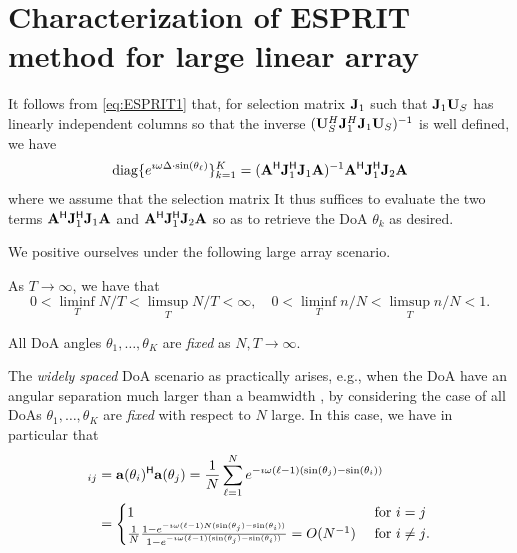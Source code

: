 \documentclass[11pt,a4paper]{article}
\begin{document}
\section{Characterization of ESPRIT method for large linear array}


It follows from \eqref{eq:ESPRIT1} that, for selection matrix ${\mathbf{J}}_1$ such that ${\mathbf{J}}_1  {\mathbf{U}}_S$ has linearly independent columns so that the inverse $( {\mathbf{U}}_S^H {\mathbf{J}}_1^H {\mathbf{J}}_1  {\mathbf{U}}_S )^{-1} $ is well defined, we have 
\begin{align*}
         \operatorname{diag}\{ e^{\imath \omega \Delta \cdot \sin(\theta_\ell)} \}_{k=1}^K = ({\mathbf{A}}^{\sf H} {\mathbf{J}}_1^{\sf H} {\mathbf{J}}_1 {\mathbf{A}})^{-1} {\mathbf{A}}^{\sf H} {\mathbf{J}}_1^{\sf H} {\mathbf{J}}_2 {\mathbf{A}} 
\end{align*}
where we assume that the selection matrix 
It thus suffices to evaluate the two terms $ {\mathbf{A}}^{\sf H} {\mathbf{J}}_1^{\sf H} {\mathbf{J}}_1 {\mathbf{A}}$ and ${\mathbf{A}}^{\sf H} {\mathbf{J}}_1^{\sf H} {\mathbf{J}}_2  {\mathbf{A}}$ so as to retrieve the DoA $\theta_k$ as desired.

We positive ourselves under the following large array scenario.

\begin{Assumption}\label{ass:large_array}
As $T \to \infty$, we have that 
\begin{equation}
    0 < \liminf_T N/T < \limsup_T N/T < \infty, \quad 0 < \liminf_T n/N < \limsup_T n/N < 1.
\end{equation}
\end{Assumption}

\begin{Assumption}\label{ass:wide}
All DoA angles $\theta_1, \ldots, \theta_K$ are \emph{fixed} as $N,T \to \infty$.
\end{Assumption}


The \emph{widely spaced} DoA scenario as  practically arises, e.g., when the DoA have an angular separation much larger than a beamwidth \cite{Vallet2015Performance}, by considering the case of all DoAs $\theta_1, \ldots, \theta_K$ are \emph{fixed} with respect to $N$ large.
In this case, we have in particular that 
\begin{align*}
    [\A^\H \A]_{ij} &= \mathbf{a}(\theta_i)^\H \mathbf{a}(\theta_j) = \frac1N \sum_{\ell = 1}^N e^{-\imath \omega (\ell-1) (\sin (\theta_j) - \sin(\theta_i) )} \\ 
    &= \begin{cases}
        1 &~\text{for $i = j$} \\
        \frac1N \frac{ 1 - e^{-\imath \omega (\ell-1) N (\sin (\theta_j) - \sin(\theta_i) )} }{ 1 - e^{-\imath \omega (\ell-1) (\sin (\theta_j) - \sin(\theta_i) )} } = O(N^{-1})    &~\text{for $i \neq j$}.
    \end{cases}
\end{align*}
\end{document}

